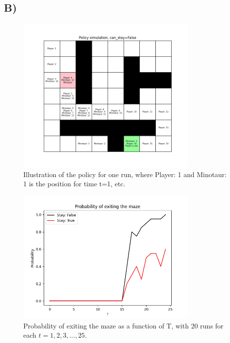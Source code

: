 \documentclass{article}
\begin{document}
\subsection*{B)}
\begin{figure}[H]
    \centering
    \includegraphics[width=0.8\textwidth]{Lab_1/images/problem_1/MazeRun_Nov-16-2020_10-00-04.png}
    \caption{\small Illustration of the policy for one run, where Player: 1 and Minotaur: 1 is the position for time t=1, etc. }
    \label{fig:Policy}
\end{figure}

\begin{figure}[H]
    \centering
    \includegraphics[width=0.8\textwidth]{Lab_1/images/problem_1/probability_of_exiting_the_maze_2.png}
    \caption{\small Probability of exiting the maze as a function of T, with 20 runs for each $t=1,2,3,...,25$.}
    \label{fig:probability_exiting}
\end{figure}
\end{document}
